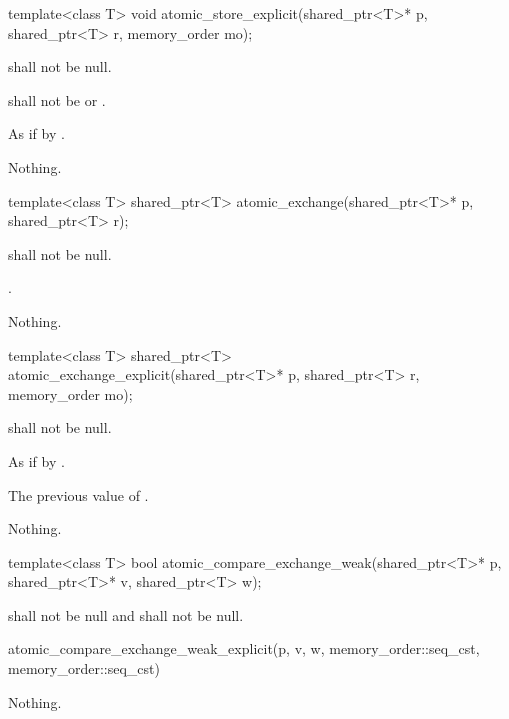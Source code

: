 %
\begin{itemdecl}
template<class T> void atomic_store_explicit(shared_ptr<T>* p, shared_ptr<T> r, memory_order mo);
\end{itemdecl}

\begin{itemdescr}
\pnum
\requires {} shall not be null.

\pnum
\requires {} shall not be  or .

\pnum
\effects
As if by .

\pnum
\throws
Nothing.
\end{itemdescr}

%
\begin{itemdecl}
template<class T> shared_ptr<T> atomic_exchange(shared_ptr<T>* p, shared_ptr<T> r);
\end{itemdecl}

\begin{itemdescr}
\pnum
\requires {} shall not be null.

\pnum
\returns
{}.

\pnum
\throws
Nothing.
\end{itemdescr}

%
\begin{itemdecl}
template<class T>
  shared_ptr<T> atomic_exchange_explicit(shared_ptr<T>* p, shared_ptr<T> r, memory_order mo);
\end{itemdecl}

\begin{itemdescr}
\pnum
\requires {} shall not be null.

\pnum
\effects
As if by .

\pnum
\returns
The previous value of .

\pnum
\throws
Nothing.
\end{itemdescr}

%
\begin{itemdecl}
template<class T>
  bool atomic_compare_exchange_weak(shared_ptr<T>* p, shared_ptr<T>* v, shared_ptr<T> w);
\end{itemdecl}

\begin{itemdescr}
\pnum
\requires {} shall not be null and  shall not be null.

\pnum
\returns
\begin{codeblock}
atomic_compare_exchange_weak_explicit(p, v, w, memory_order::seq_cst, memory_order::seq_cst)
\end{codeblock}

\pnum
\throws
Nothing.
\end{itemdescr}

